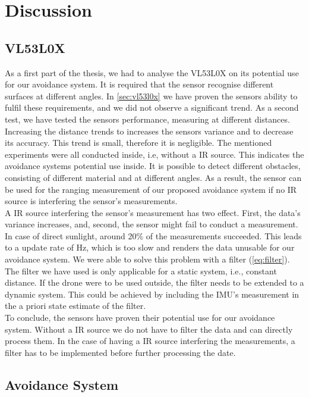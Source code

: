 \chapter{Discussion}

\section{VL53L0X}
As a first part of the thesis, we had to analyse the VL53L0X on its potential use for our avoidance system. It is required that the sensor recognise different surfaces at different angles. In \cref{sec:vl53l0x} we have proven the sensors ability to fulfil these requirements, and we did not observe a significant trend. As a second test, we have tested the sensors performance, measuring at different distances. Increasing the distance trends to increases the sensors variance and to decrease its accuracy. This trend is small, therefore it is negligible. The mentioned experiments were all conducted inside, i.e, without a IR source. This indicates the avoidance systems potential use inside. It is possible to detect different obstacles, consisting of different material and at different angles. As a result, the sensor can be used for the ranging measurement of our proposed avoidance system if no IR source is interfering the sensor's measurements. \\
A IR source interfering the sensor's measurement has two effect. First, the data's variance increases, and, second, the sensor might fail to conduct a measurement. In case of direct sunlight, around 20\% of the measurements succeeded. This leads to a update rate of \unit[1]{Hz}, which is too slow and renders the data unusable for our avoidance system. We were able to solve this problem with a filter (\cref{eq:filter}). The filter we have used is only applicable for a static system, i.e., constant distance. If the drone were to be used outside, the filter needs to be extended to a dynamic system. This could be achieved by including the IMU's measurement in the a priori state estimate of the filter. \\
To conclude, the sensors have proven their potential use for our avoidance system. Without a IR source we do not have to filter the data and can directly process them. In the case of having a IR source interfering the measurements, a filter has to be implemented before further processing the date.  

\section{Avoidance System}

